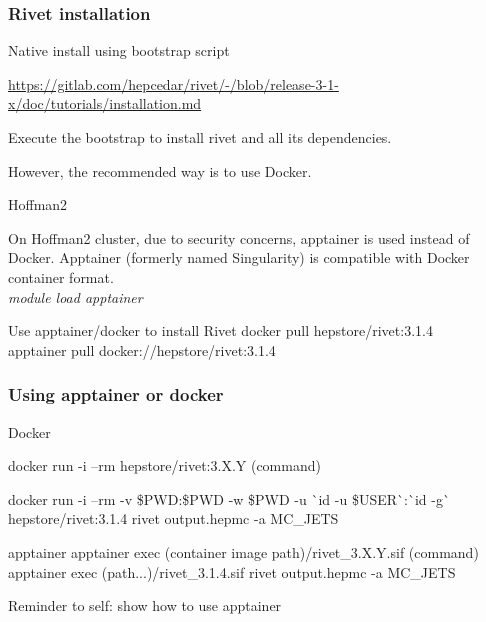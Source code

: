 \documentclass{beamer}
\begin{document}
\begin{frame}
 \frametitle{Rivet installation}
 \begin{block}{Native install using bootstrap script}
 	\begin{scriptsize}
 	\url{https://gitlab.com/hepcedar/rivet/-/blob/release-3-1-x/doc/tutorials/installation.md}  \\
 \end{scriptsize}
 	Execute the bootstrap to install rivet and all its dependencies.
 \end{block}
However, the recommended way is to use Docker.

\begin{alertblock}{Hoffman2} 
	\begin{small}
	On Hoffman2 cluster, due to security concerns, apptainer is used instead of Docker.
	Apptainer (formerly named Singularity) is compatible with Docker container format.\\
	\emph{module load apptainer}
	\end{small}
\end{alertblock}

\begin{exampleblock}{Use apptainer/docker to install Rivet}
	   docker pull hepstore/rivet:3.1.4 \\
	   apptainer pull docker://hepstore/rivet:3.1.4
\end{exampleblock}

\end{frame}



\begin{frame}
 \frametitle{Using apptainer or docker}
 \begin{block}{Docker}
 
   	docker run -i --rm hepstore/rivet:3.X.Y (command)
   	
   	docker run -i  --rm  -v \$PWD:\$PWD -w \$PWD -u \`{}id -u \$USER\`{}:\`{}id -g\`{} hepstore/rivet:3.1.4 rivet output.hepmc -a MC\_JETS

 \end{block}

\begin{exampleblock}{apptainer}
	apptainer exec (container image path)/rivet\_3.X.Y.sif (command)
	apptainer exec (path...)/rivet\_3.1.4.sif rivet output.hepmc -a MC\_JETS
\end{exampleblock}

Reminder to self: show how to use apptainer

\end{frame}
\end{document}
